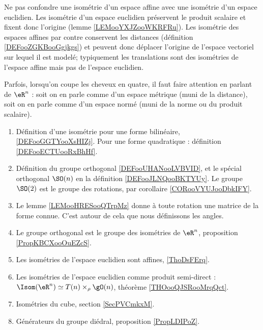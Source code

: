 
      \label{THMooVUCLooCrdbxm}

Ne pas confondre une isométrie d'un espace affine avec une isométrie d'un espace euclidien. Les isométrie d'un espace euclidien préservent le produit scalaire et fixent donc l'origine (lemme \ref{LEMooYXJZooWKRFRu}). Les isométrie des espaces affines par contre conservent les distances (définition \ref{DEFooZGKBooGgjkgs}) et peuvent donc déplacer l'origine de l'espace vectoriel sur lequel il est modelé; typiquement les translations sont des isométries de l'espace affine mais pas de l'espace euclidien.

Parfois, lorsqu'on coupe les cheveux en quatre, il faut faire attention en parlant de \( \eR^n\) : soit on en parle comme d'un espace métrique (muni de la distance), soit on en parle comme d'un espace normé (muni de la norme ou du produit scalaire).

\begin{enumerate}
    \item 
        Définition d'une isométrie pour une forme bilinéaire, \ref{DEFooGGTYooXsHIZj}. Pour une forme quadratique : définition \ref{DEFooECTUooRxBhHf}.
    \item
        Définition du groupe orthogonal \ref{DEFooUHANooLVBVID}, et le spécial orthogonal \( \SO(n)\) en la définition \ref{DEFooJLNQooBKTYUy}. Le groupe \( \SO(2)\) est le groupe des rotations, par corollaire \ref{CORooVYUJooDbkIFY}.
    \item
        Le lemme \ref{LEMooHRESooQTrpMz} donne à toute rotation une matrice de la forme connue. C'est autour de cela que nous définissons les angles.
    \item
        Le groupe orthogonal est le groupe des isométries de \( \eR^n\), proposition \ref{PropKBCXooOuEZcS}.
    \item
        Les isométries de l'espace euclidien sont affines, \ref{ThoDsFErq}.
    \item
        Les isométries de l'espace euclidien comme produit semi-direct : $\Isom(\eR^n)\simeq T(n)\times_{\rho}\gO(n)$, théorème \ref{THOooQJSRooMrqQct}.
    \item
        Isométries du cube, section \ref{SecPVCmkxM}.
    \item 
        Générateurs du groupe diédral, proposition \ref{PropLDIPoZ}.
\end{enumerate}
